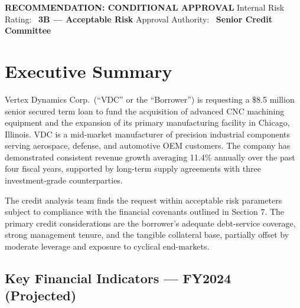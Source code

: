 \documentclass[11pt,a4paper]{article}
\begin{document}
\vspace{8pt}

\begin{tcolorbox}[
  enhanced, arc=3pt,
  colback=GreenOK!10, colframe=GreenOK,
  boxrule=0.7pt,
  top=6pt, bottom=6pt, left=10pt, right=10pt,
]
  \noindent
  {\color{GreenOK}\faCheckCircle\enspace}%
  {\bfseries\color{GreenOK} RECOMMENDATION: CONDITIONAL APPROVAL}%
  \hfill
  {\color{SlateGray}\small Internal Risk Rating:\ }{\bfseries\color{NavyInk} 3B — Acceptable Risk}%
  \hfill
  {\color{SlateGray}\small Approval Authority:\ }{\bfseries\color{NavyInk} Senior Credit Committee}
\end{tcolorbox}

\vspace{2mm}

\section{Executive Summary}

Vertex Dynamics Corp.\ (``VDC'' or the ``Borrower'') is requesting a \$8.5 million senior secured
term loan to fund the acquisition of advanced CNC machining equipment and the expansion of its
primary manufacturing facility in Chicago, Illinois. VDC is a mid-market manufacturer of
precision industrial components serving aerospace, defense, and automotive OEM customers. The
company has demonstrated consistent revenue growth averaging 11.4\% annually over the past
four fiscal years, supported by long-term supply agreements with three investment-grade
counterparties.

The credit analysis team finds the request within acceptable risk parameters subject to
compliance with the financial covenants outlined in Section 7. The primary credit considerations
are the borrower's adequate debt-service coverage, strong management tenure, and the tangible
collateral base, partially offset by moderate leverage and exposure to cyclical end-markets.

\vspace{4pt}

\subsection{Key Financial Indicators — FY2024 (Projected)}
\end{document}
